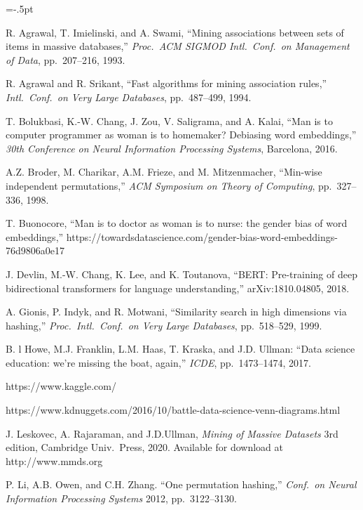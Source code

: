 \documentclass[11pt]{article}
\begin{document}
\vspace{-.1cm}

\begin{thebibliography}{10}
\begin{small}
\itemsep=-.5pt

R. Agrawal, T. Imielinski, and A. Swami,
``Mining associations between sets of items in massive databases,''
{\em Proc.\ ACM SIGMOD Intl.\ Conf.\ on Management of Data},
pp.~207--216, 1993.

R. Agrawal and R. Srikant,
``Fast algorithms for mining association rules,''
{\em Intl.\ Conf.\ on Very Large Databases}, pp.~487--499, 1994.

T. Bolukbasi, K.-W. Chang, J. Zou, V. Saligrama, and A. Kalai,
``Man is to computer programmer as woman is to homemaker? Debiasing word embeddings,''
{\em 30th Conference on Neural Information Processing Systems}, Barcelona, 2016.

A.Z. Broder, M. Charikar, A.M. Frieze, and M. Mitzenmacher,
``Min-wise independent permutations,''
{\em ACM Symposium on Theory of Computing}, pp.~327--336, 1998.

T. Buonocore, ``Man is to doctor as woman is to nurse: the gender bias of word embeddings,'' https://towardsdatascience.com/gender-bias-word-embeddings-76d9806a0e17

J. Devlin, M.-W. Chang, K. Lee, and K. Toutanova,
``BERT: Pre-training of deep bidirectional transformers for language understanding,''
arXiv:1810.04805, 2018.

A. Gionis, P. Indyk, and R. Motwani,
``Similarity search in high dimensions via hashing,''
{\em Proc.\ Intl.\ Conf.\ on Very Large Databases}, pp.~518--529, 1999.

B. l Howe, M.J. Franklin, L.M. Haas, T. Kraska, and J.D. Ullman:
``Data science education: we're missing the boat, again,'' {\em ICDE}, pp.~1473--1474, 2017.

https://www.kaggle.com/

https://www.kdnuggets.com/2016/10/battle-data-science-venn-diagrams.html

J. Leskovec, A. Rajaraman, and J.D.Ullman,
{\em Mining of Massive Datasets} 3rd edition, Cambridge Univ.\ Press, 2020.  Available for download at http://www.mmds.org

P. Li, A.B. Owen, and C.H. Zhang.
``One permutation hashing,''
{\em Conf.\ on Neural Information Processing Systems} 2012, pp.~3122--3130.


\end{small}
\end{thebibliography}
\end{document}
